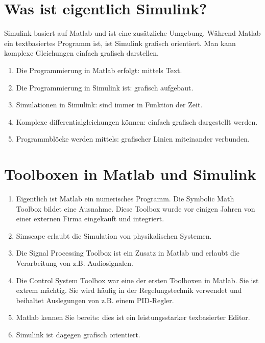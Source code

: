 \section{Was ist eigentlich Simulink?}
Simulink basiert auf Matlab und ist eine zusätzliche Umgebung. Während Matlab ein textbasiertes Programm ist, ist Simulink grafisch orientiert. Man kann komplexe Gleichungen einfach grafisch darstellen.
\begin{enumerate}
\item Die Programmierung in Matlab erfolgt: {\color{magenta}mittels Text}.
\item Die Programmierung in Simulink ist: {\color{magenta}grafisch aufgebaut}.
\item Simulationen in Simulink: {\color{magenta}sind immer in Funktion der Zeit}.
\item Komplexe differentialgleichungen können: {\color{magenta}einfach grafisch dargestellt werden}.
\item Programmblöcke werden mittels: {\color{magenta}grafischer Linien miteinander verbunden}.
\end{enumerate}
\section{Toolboxen in Matlab und Simulink}
\begin{enumerate}
\item Eigentlich ist Matlab ein numerisches Programm. Die {\color{magenta}Symbolic Math Toolbox} bildet eine Ausnahme. Diese Toolbox wurde vor einigen Jahren von einer externen Firma eingekauft und integriert.
\item {\color{magenta}Simscape} erlaubt die Simulation von physikalischen Systemen.
\item Die {\color{magenta}Signal Processing Toolbox} ist ein Zusatz in Matlab und erlaubt die Verarbeitung von z.B. Audiosignalen.
\item Die {\color{magenta}Control System Toolbox} war eine der ersten Toolboxen in Matlab. Sie ist extrem mächtig. Sie wird häufig in der Regelungstechnik verwendet und beihaltet Auslegungen von z.B. einem PID-Regler.
\item {\color{magenta}Matlab} kennen Sie bereits: dies ist ein leistungsstarker texbasierter Editor.
\item {\color{magenta}Simulink} ist dagegen grafisch orientiert.
\end{enumerate}

